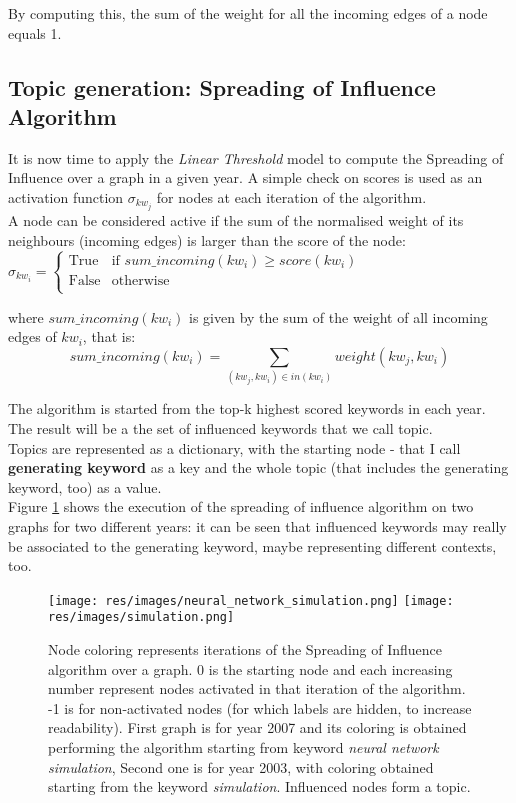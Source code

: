 \documentclass{article}
\begin{document}
By computing this, the sum of the weight for all the incoming edges of a node equals 1.




\subsection{Topic generation: Spreading of Influence Algorithm}
It is now time to apply the \textit{Linear Threshold} model to compute the Spreading of Influence over a graph in a given year.
A simple check on scores is used as an activation function $\sigma_{kw_j}$ for nodes at each iteration of the algorithm.\\
A node can be considered active if the sum of the normalised weight of
	its neighbours (incoming edges)
	is larger than the score of the node:\\
$\sigma_{kw_i}= \begin{cases}
	\text{True} & \mbox{if } sum\_incoming(kw_i) \geq score(kw_i)\\
	\text{False} & \mbox{otherwise}\\
	\end{cases}$
	
where $sum\_incoming(kw_i)$ is given by the sum of the weight of all incoming edges of $kw_i$, that is:
\begin{equation}
	sum\_incoming(kw_i) = \sum_{(kw_j,kw_i) \in in(kw_i)} weight(kw_j,kw_i)
\end{equation}

The algorithm is started from the top-k highest scored keywords in each year.\\
The result will be a the set of influenced keywords that we call topic.\\
Topics are represented as a dictionary, with the starting node - that I call \textbf{generating keyword} as a key and the whole topic (that includes the generating keyword, too) as a value.\\
Figure \ref{spread_infl} shows the execution of the spreading of influence algorithm on two graphs for two different years: it can be seen that influenced keywords may really be associated to the generating keyword, maybe representing different contexts, too.

\begin{figure}[H]
\texttt{[image: res/images/neural\_network\_simulation.png]}
\texttt{[image: res/images/simulation.png]}
\centering
\caption{Node coloring represents iterations of the Spreading of Influence algorithm over a graph. 0 is the starting node and each increasing number represent nodes activated in that iteration of the algorithm. -1 is for non-activated nodes (for which labels are hidden, to increase readability).
First graph is for year 2007 and its coloring is obtained performing the algorithm starting from keyword \textit{neural network simulation},
Second one is for year 2003, with coloring obtained starting from the keyword \textit{simulation}. Influenced nodes form a topic.}
\label{spread_infl}
\end{figure}
\end{document}
